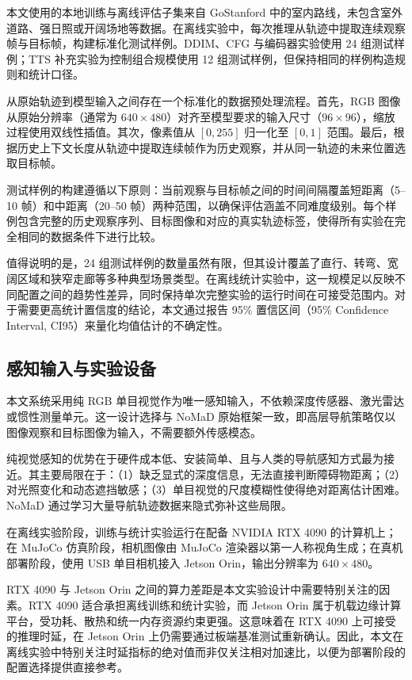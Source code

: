 本文使用的本地训练与离线评估子集来自 GoStanford 中的室内路线，未包含室外道路、强日照或开阔场地等数据。在离线实验中，每次推理从轨迹中提取连续观察帧与目标帧，构建标准化测试样例。DDIM、CFG 与编码器实验使用 24 组测试样例；TTS 补充实验为控制组合规模使用 12 组测试样例，但保持相同的样例构造规则和统计口径。

从原始轨迹到模型输入之间存在一个标准化的数据预处理流程。首先，RGB 图像从原始分辨率（通常为 $640 \times 480$）对齐至模型要求的输入尺寸（$96 \times 96$），缩放过程使用双线性插值。其次，像素值从 $[0, 255]$ 归一化至 $[0, 1]$ 范围。最后，根据历史上下文长度从轨迹中提取连续帧作为历史观察，并从同一轨迹的未来位置选取目标帧。

测试样例的构建遵循以下原则：当前观察与目标帧之间的时间间隔覆盖短距离（5--10 帧）和中距离（20--50 帧）两种范围，以确保评估涵盖不同难度级别。每个样例包含完整的历史观察序列、目标图像和对应的真实轨迹标签，使得所有实验在完全相同的数据条件下进行比较。

值得说明的是，24 组测试样例的数量虽然有限，但其设计覆盖了直行、转弯、宽阔区域和狭窄走廊等多种典型场景类型。在离线统计实验中，这一规模足以反映不同配置之间的趋势性差异，同时保持单次完整实验的运行时间在可接受范围内。对于需要更高统计置信度的结论，本文通过报告 95\% 置信区间（95\% Confidence Interval, CI95）来量化均值估计的不确定性。

\subsection{感知输入与实验设备}

本文系统采用纯 RGB 单目视觉作为唯一感知输入，不依赖深度传感器、激光雷达或惯性测量单元。这一设计选择与 NoMaD 原始框架一致，即高层导航策略仅以图像观察和目标图像为输入，不需要额外传感模态。

纯视觉感知的优势在于硬件成本低、安装简单、且与人类的导航感知方式最为接近。其主要局限在于：（1）缺乏显式的深度信息，无法直接判断障碍物距离；（2）对光照变化和动态遮挡敏感；（3）单目视觉的尺度模糊性使得绝对距离估计困难。NoMaD 通过学习大量导航轨迹数据来隐式弥补这些局限。

在离线实验阶段，训练与统计实验运行在配备 NVIDIA RTX 4090 的计算机上；在 MuJoCo 仿真阶段，相机图像由 MuJoCo 渲染器以第一人称视角生成；在真机部署阶段，使用 USB 单目相机接入 Jetson Orin，输出分辨率为 $640\times480$。

RTX 4090 与 Jetson Orin 之间的算力差距是本文实验设计中需要特别关注的因素。RTX 4090 适合承担离线训练和统计实验，而 Jetson Orin 属于机载边缘计算平台，受功耗、散热和统一内存资源约束更强。这意味着在 RTX 4090 上可接受的推理时延，在 Jetson Orin 上仍需要通过板端基准测试重新确认。因此，本文在离线实验中特别关注时延指标的绝对值而非仅关注相对加速比，以便为部署阶段的配置选择提供直接参考。

